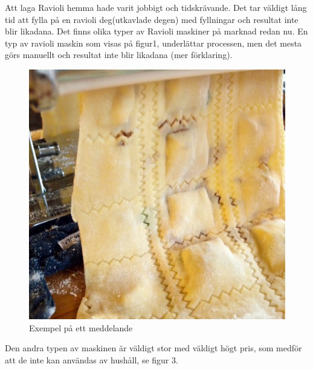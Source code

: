 Att laga Ravioli hemma hade varit jobbigt och tidskrävande. Det tar väldigt lång tid att fylla på en ravioli deg(utkavlade degen) med fyllningar och resultat inte blir likadana.
Det finns olika typer av Ravioli maskiner på marknad redan nu. En typ av ravioli maskin som visas på figur1, underlättar processen, men det mesta görs manuellt och resultat inte blir likadana (mer förklaring).\\

	 \begin{figure}[ht]
	 	\begin{center}
	 		\includegraphics[width=18cm]{images/makingravioli.jpg}
	 		\caption{Exempel på ett meddelande}
	 		\label{messageExample}
	 	\end{center}
	 \end{figure}
Den andra typen av maskinen är väldigt stor med väldigt högt pris, som medför att de inte kan användas av hushåll, se figur 3.

